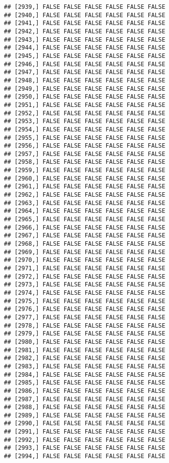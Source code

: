 \documentclass[
]{article}
\begin{document}
\begin{verbatim}
## [2939,] FALSE FALSE FALSE FALSE FALSE FALSE
## [2940,] FALSE FALSE FALSE FALSE FALSE FALSE
## [2941,] FALSE FALSE FALSE FALSE FALSE FALSE
## [2942,] FALSE FALSE FALSE FALSE FALSE FALSE
## [2943,] FALSE FALSE FALSE FALSE FALSE FALSE
## [2944,] FALSE FALSE FALSE FALSE FALSE FALSE
## [2945,] FALSE FALSE FALSE FALSE FALSE FALSE
## [2946,] FALSE FALSE FALSE FALSE FALSE FALSE
## [2947,] FALSE FALSE FALSE FALSE FALSE FALSE
## [2948,] FALSE FALSE FALSE FALSE FALSE FALSE
## [2949,] FALSE FALSE FALSE FALSE FALSE FALSE
## [2950,] FALSE FALSE FALSE FALSE FALSE FALSE
## [2951,] FALSE FALSE FALSE FALSE FALSE FALSE
## [2952,] FALSE FALSE FALSE FALSE FALSE FALSE
## [2953,] FALSE FALSE FALSE FALSE FALSE FALSE
## [2954,] FALSE FALSE FALSE FALSE FALSE FALSE
## [2955,] FALSE FALSE FALSE FALSE FALSE FALSE
## [2956,] FALSE FALSE FALSE FALSE FALSE FALSE
## [2957,] FALSE FALSE FALSE FALSE FALSE FALSE
## [2958,] FALSE FALSE FALSE FALSE FALSE FALSE
## [2959,] FALSE FALSE FALSE FALSE FALSE FALSE
## [2960,] FALSE FALSE FALSE FALSE FALSE FALSE
## [2961,] FALSE FALSE FALSE FALSE FALSE FALSE
## [2962,] FALSE FALSE FALSE FALSE FALSE FALSE
## [2963,] FALSE FALSE FALSE FALSE FALSE FALSE
## [2964,] FALSE FALSE FALSE FALSE FALSE FALSE
## [2965,] FALSE FALSE FALSE FALSE FALSE FALSE
## [2966,] FALSE FALSE FALSE FALSE FALSE FALSE
## [2967,] FALSE FALSE FALSE FALSE FALSE FALSE
## [2968,] FALSE FALSE FALSE FALSE FALSE FALSE
## [2969,] FALSE FALSE FALSE FALSE FALSE FALSE
## [2970,] FALSE FALSE FALSE FALSE FALSE FALSE
## [2971,] FALSE FALSE FALSE FALSE FALSE FALSE
## [2972,] FALSE FALSE FALSE FALSE FALSE FALSE
## [2973,] FALSE FALSE FALSE FALSE FALSE FALSE
## [2974,] FALSE FALSE FALSE FALSE FALSE FALSE
## [2975,] FALSE FALSE FALSE FALSE FALSE FALSE
## [2976,] FALSE FALSE FALSE FALSE FALSE FALSE
## [2977,] FALSE FALSE FALSE FALSE FALSE FALSE
## [2978,] FALSE FALSE FALSE FALSE FALSE FALSE
## [2979,] FALSE FALSE FALSE FALSE FALSE FALSE
## [2980,] FALSE FALSE FALSE FALSE FALSE FALSE
## [2981,] FALSE FALSE FALSE FALSE FALSE FALSE
## [2982,] FALSE FALSE FALSE FALSE FALSE FALSE
## [2983,] FALSE FALSE FALSE FALSE FALSE FALSE
## [2984,] FALSE FALSE FALSE FALSE FALSE FALSE
## [2985,] FALSE FALSE FALSE FALSE FALSE FALSE
## [2986,] FALSE FALSE FALSE FALSE FALSE FALSE
## [2987,] FALSE FALSE FALSE FALSE FALSE FALSE
## [2988,] FALSE FALSE FALSE FALSE FALSE FALSE
## [2989,] FALSE FALSE FALSE FALSE FALSE FALSE
## [2990,] FALSE FALSE FALSE FALSE FALSE FALSE
## [2991,] FALSE FALSE FALSE FALSE FALSE FALSE
## [2992,] FALSE FALSE FALSE FALSE FALSE FALSE
## [2993,] FALSE FALSE FALSE FALSE FALSE FALSE
## [2994,] FALSE FALSE FALSE FALSE FALSE FALSE

\end{verbatim}
\end{document}

